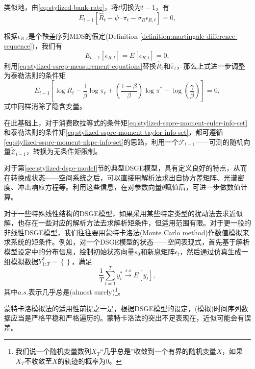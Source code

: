 类似地，由\eqref{eq:stylized-bank-rate}，将$t$切换为$t-1$，有
\begin{equation*}
  E_{t-1} \left[ \hat{R}_{t} - \psi \cdot \hat{\pi}_{t} - \sigma_{R} \epsilon_{R,t} \right]=0,
\end{equation*}

根据$\epsilon_{R,t}$是个鞅差序列MDS的假定(Definition \ref{definition:martingale-difference-sequence})，我们有
\begin{equation*}
  E_{t-1} \left[ \epsilon_{R,t} \right] = E \left[ \epsilon_{R,t} \right] = 0,
\end{equation*}
利用\eqref{eq:stylized-ssrep-measurement-equations}替换$\hat{R}_{t}$和$\hat{\pi}_{t}$，那么上式进一步调整为泰勒法则的条件矩
\begin{equation}
  \label{eq:stylized-sspre-moment-taylor-info-set}
  E_{t-1}
  \left[
  \log R_{t} - \frac{1}{\beta} \log \pi_{t} + \left( \frac{1 - \beta}{\beta} \right) \log \pi^{*} - \log \left( \frac{\gamma}{\beta} \right)
  \right] = 0,
\end{equation}
式中同样消除了隐含变量。

在此基础上，对于消费欧拉等式的条件矩\eqref{eq:stylized-sspre-moment-euler-info-set}和泰勒法则的条件矩\eqref{eq:stylized-sspre-moment-taylor-info-set}，都可遵循\eqref{eq:stylized-sspre-moment-nkpc-info-set}的思路，利用一个$\mathcal{F}_{t-1}$——可测的随机向量$\widetilde{\mathcal{Z}}_{t-1}$，转换为无条件矩限制。

对于第\ref{sec:stylized-dsge-model}节的典型DSGE模型，具有定义良好的特点，从而在转换成状态——空间系统之后，可以直接用解析法求出自协方差矩阵、光谱密度、冲击响应方程等。利用这些信息，在对参数向量$\theta$赋值后，可进一步做数值计算。

对于一些特殊线性结构的DSGE模型，如果采用某些特定类型的扰动法去求近似解，也存在一些对应的解析方法去求解析矩条件，但适用范围有限\citep{Andreasen:2016cd}。对于更一般的非线性DSGE模型，我们往往要用蒙特卡洛法(Monte Carlo method)作数值模拟来求系统的矩条件。例如，对一个DSGE模型的状态——空间表现式，首先基于解析模型设定中的分布信息，绘制初始状态向量$s_{0}$和新息矩阵$\epsilon_{t}$，然后通过仿真生成一组模拟数据$Y_{1:T}^{*}=\left\{ \right\}$，满足
\begin{equation}
  \label{eq:stylized-ssrep-simulation-mcmc}
  \frac{1}{T} \sum_{t=1}^{T} y_{t}^{*} \xrightarrow{s.s} E \left[ y_{t} \right],
\end{equation}
其中$a.s.$表示几乎总是(almost surely)\footnote{我们说一个随机变量数列$X_{T}$“几乎总是”收敛到一个有界的随机变量$X$，如果$X_{T}$不收敛至$X$的轨迹的概率为$0$。}。

蒙特卡洛模拟法的适用性前提之一是，根据DSGE模型的设定，(模拟)时间序列数据应当是严格平稳和严格遍历的。蒙特卡洛法的突出不足表现在，近似可能会有误差。%
